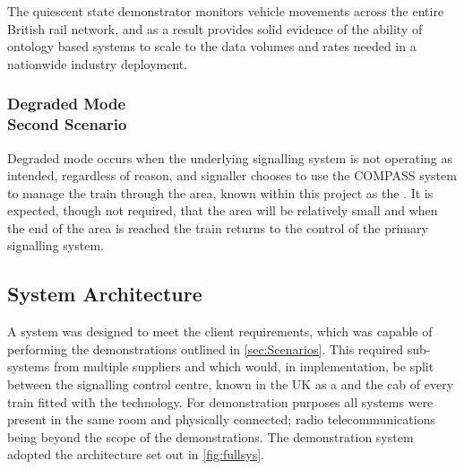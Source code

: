 The quiescent state demonstrator monitors vehicle movements across the entire British rail network, and as a result provides solid evidence of the ability of ontology based systems to scale to the data volumes and rates needed in a nationwide industry deployment.

\subsubsection[Degraded Mode]{Degraded Mode \\ Second Scenario}
Degraded mode occurs when the underlying signalling system is not operating as intended, regardless of reason, and signaller chooses to use the COMPASS system to manage the train through the area, known within this project as the . It is expected, though not required, that the area will be relatively small and when the end of the area is reached the train returns to the control of the primary signalling system. 


\subsection{System Architecture}
A system was designed to meet the client requirements, which was capable of performing the demonstrations outlined in \autoref{sec:Scenarios}. This required sub-systems from multiple suppliers and which would, in implementation, be split between the signalling control centre, known in the UK as a  and the cab of every train fitted with the technology. For demonstration purposes all systems were present in the same room and physically connected; radio telecommunications being beyond the scope of the demonstrations. The demonstration system adopted the architecture set out in \autoref{fig:fullsys}. 

